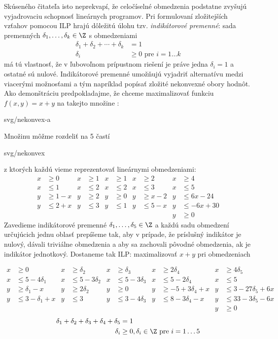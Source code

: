 \noindent Skúseného čitateľa isto neprekvapí, že celočíselné obmedzenia
podstatne zvyšujú vyjadrovaciu schopnosť lineárnych programov. Pri formulovaní
zložitejších vzťahov pomocou ILP hrajú dôležitú úlohu tzv. {\em indikátorové
premenné}: sada premenných $\delta_1,\ldots,\delta_k\in\Z$ s obmedzeniami
\begin{align*}
  \delta_1+\delta_2+\cdots+\delta_k&=1\\
  \delta_i&\ge0\text{\ pre\ }i=1\ldots k
\end{align*}
má tú vlastnosť, že v ľubovoľnom prípustnom riešení je práve jedna $\delta_i=1$
a ostatné sú nulové.  Indikátorové premenné umožňujú vyjadriť alternatívu medzi
viacerými možnosťami a tým napríklad popísať zložité nekonvexné obory hodnôt.
Ako demonštráciu predpokladajme, že chceme maximalizovať funkciu $f(x,y)=x+y$
na takejto množine \dom:

\begin{myfig}{0.4\textwidth}{svg/nekonvex-a}
\end{myfig}

\noindent
Množinu \dom môžme rozdeliť na 5 častí
\begin{myfig}{0.4\textwidth}{svg/nekonvex}
\end{myfig}
z ktorých každú vieme reprezentovať lineárnymi obmedzeniami:
\begin{align*}
  x&\ge0    & x&\ge1 & x&\ge1 & x&\ge2    & x&\ge4\\
  x&\le1    & x&\le2 & x&\le2 & x&\le3    & x&\le5\\
  y&\ge1-x  & y&\ge2 & y&\ge0 & y&\ge x-2 & y&\le6x-24\\
  y&\le2+x  & y&\le3 & y&\le1 & y&\le5-x  & y&\le-6x+30\\
   &        &  &     &  &     &  &        & y&\ge0
\end{align*}
Zavedieme indikátorové premenné $\delta_1,\ldots,\delta_5\in\Z$ a každú sadu
obmedzení určujúcich jednu oblasť prepíšeme tak, aby v prípade, že príslušný
indikátor je nulový, dávali triviálne obmedzenia a aby sa zachovali pôvodné
obmedzenia, ak je indikátor jednotkový. Dostaneme tak ILP: maximalizovať $x+y$
pri obmedzeniach

\begin{align*}
  x&\ge0                  & x&\ge\delta_2    & x&\ge\delta_3    & x&\ge2\delta_4            & x&\ge4\delta_5\\
  x&\le5-4\delta_1        & x&\le5-3\delta_2 & x&\le5-3\delta_3 & x&\le5-2\delta_4          & x&\le5\\
  y&\ge\delta_1-x         & y&\ge2\delta_2   & y&\ge0           & y&\ge-5+3\delta_4+x  & y&\le3-27\delta_5+6x\\
  y&\le3-\delta_1+x   & y&\le3           & y&\le3-4\delta_3 & y&\le8-3\delta_4-x    & y&\le33-3\delta_5-6x\\
   &                      &  &               &  &               &  &                        & y&\ge0
\end{align*}
\begin{align*}
  \delta_1+\delta_2+\delta_3+\delta_4+\delta_5&=1\\
  \delta_i&\ge0, \delta_i\in\Z\text{\ pre\ }i=1\ldots 5
\end{align*}

